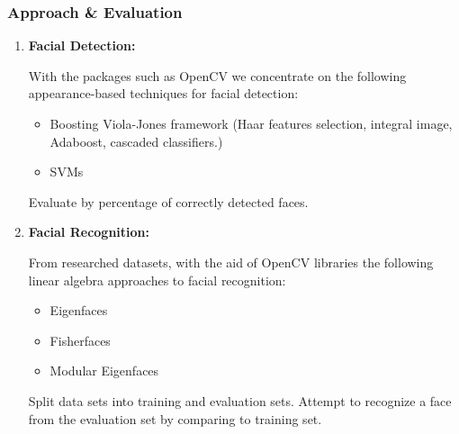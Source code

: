 \documentclass{beamer}
\begin{document}
\begin{frame}[t]\frametitle{Approach \& Evaluation}

    \begin{enumerate}
        \item \textbf{Facial Detection:} 

        With the packages such as OpenCV we concentrate on the following appearance-based techniques for facial detection:
      \begin{itemize}
        \item Boosting Viola-Jones framework (Haar features selection, integral image, Adaboost, cascaded classifiers.)
        \item SVMs
      \end{itemize}
      Evaluate by percentage of correctly detected faces.

        \item \textbf{Facial Recognition:} 

        From researched datasets, with the aid of OpenCV libraries the following linear algebra approaches to facial recognition:
        \begin{itemize}
          \item Eigenfaces
          \item Fisherfaces
          \item Modular Eigenfaces
        \end{itemize}
        Split data sets into training and evaluation sets. Attempt to recognize a face from the evaluation set by comparing to training set.
    \end{enumerate}

\end{frame}
\end{document}
